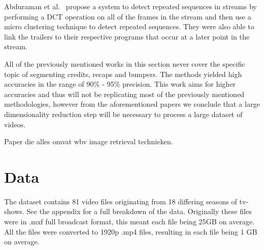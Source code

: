 \documentclass{article}
\begin{document}
Abduraman et al.\ \cite{abduraman2011unsupervised} propose a system to detect repeated sequences in streams by performing a DCT operation on all of the frames in the stream and then use a micro clustering technique to detect repeated sequences. They were also able to link the trailers to their respective programs that occur at a later point in the stream.

All of the previously mentioned works in this section never cover the specific topic of segmenting credits, recaps and bumpers. The methods yielded high accuracies in the range of 90\% - 95\% precision. This work aims for higher accuracies and thus will not be replicating most of the previously mentioned methodologies, however from the aforementioned papers we conclude that a large dimensionality reduction step will be necessary to process a large dataset of videos.

\cite{zheng2018sift} Paper die alles omvat wbv image retrieval technieken.

\section{Data} \label{data}

The dataset contains 81 video files originating from 18 differing seasons of tv-shows. See the appendix for a full breakdown of the data. Originally these files were in .mxf full broadcast format, this meant each file being 25GB on average. All the files were converted to 1920p .mp4 files, resulting in each file being 1 GB on average.
\end{document}
